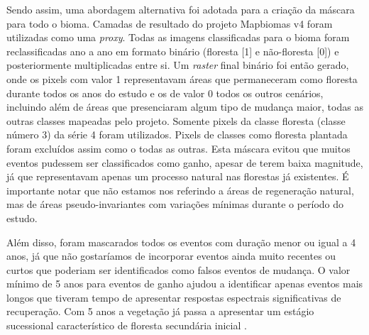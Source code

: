 Sendo assim, uma abordagem alternativa foi adotada para a criação da máscara para todo o bioma. Camadas de resultado do projeto Mapbiomas v4 foram utilizadas como uma \textit{proxy}. Todas as imagens classificadas para o bioma foram reclassificadas ano a ano em formato binário (floresta [1] e não-floresta [0]) e posteriormente multiplicadas entre si. Um \textit{raster} final binário foi então gerado, onde os pixels com valor 1 representavam áreas que permaneceram como floresta durante todos os anos do estudo e os de valor 0 todos os outros cenários, incluindo além de áreas que presenciaram algum tipo de mudança maior, todas as outras classes mapeadas pelo projeto. Somente pixels da classe floresta (classe número 3) da série 4 foram utilizados. Pixels de classes como floresta plantada foram excluídos assim como o todas as outras. Esta máscara evitou que muitos eventos pudessem ser classificados como ganho, apesar de terem baixa magnitude, já que representavam apenas um processo natural nas florestas já existentes. É importante notar que não estamos nos referindo a áreas de regeneração natural, mas de áreas pseudo-invariantes com variações mínimas durante o período do estudo. 

Além disso, foram mascarados todos os eventos com duração menor ou igual a 4 anos, já que não gostaríamos de incorporar eventos ainda muito recentes ou curtos que poderiam ser identificados como falsos eventos de mudança. O valor mínimo de 5 anos para eventos de ganho ajudou a identificar apenas eventos mais longos que tiveram tempo de apresentar respostas espectrais significativas de recuperação. Com 5 anos a vegetação já passa a apresentar um estágio sucessional característico de floresta secundária inicial \citep{Chazdon2014}. 

